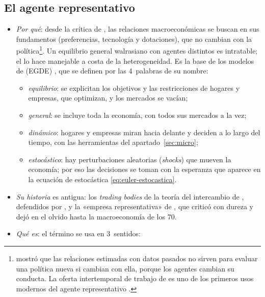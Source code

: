 \documentclass[11pt]{article}
\begin{document}
\subsection{El agente representativo}\label{sec:agente-representativo}

\begin{itemize}
\item \emph{Por qué}: desde la crítica de \textcite{Lucas1976Econometric}, las relaciones macroeconómicas se buscan en sus fundamentos (preferencias, tecnología y dotaciones), que no cambian con la política\footnote{ mostró que las relaciones estimadas con datos pasados no sirven para evaluar una política nueva si cambian con ella, porque los agentes cambian su conducta. La oferta intertemporal de trabajo de \textcite{LucasRapping1969Real} es uno de los primeros usos modernos del agente representativo .}. Un equilibrio general walrasiano con agentes distintos es intratable; el  lo hace manejable a costa de la heterogeneidad. Es la base de los modelos de  (EGDE) , que se definen por las 4~palabras de su nombre\nocite{Kocherlakota2010Modern}:
  \begin{itemize}
  \item \emph{equilibrio}: se explicitan los objetivos y las restricciones de hogares y empresas, que optimizan, y los mercados se vacían;
  \item \emph{general}: se incluye toda la economía, con todos sus mercados a la vez;
  \item \emph{dinámico}: hogares y empresas miran hacia delante y deciden a lo largo del tiempo, con las herramientas del apartado~\ref{sec:micro};
  \item \emph{estocástico}: hay perturbaciones aleatorias (\emph{shocks}) que mueven la economía; por eso las decisiones se toman con la esperanza que aparece en la ecuación de  estocástica \eqref{eq:euler-estocastica}.
  \end{itemize}
\item \emph{Su historia} es antigua\nocite{Hartley1996Origins}: los \emph{trading bodies} de la teoría del intercambio de \textcite{Jevons1871Theory}, defendidos por , y la «empresa representativa» de , que \textcite{Robbins1928Representative} criticó con dureza y dejó en el olvido hasta la macroeconomía de los 70.
\item \emph{Qué es}: el término se usa en 3~sentidos:

\end{itemize}
\end{document}
